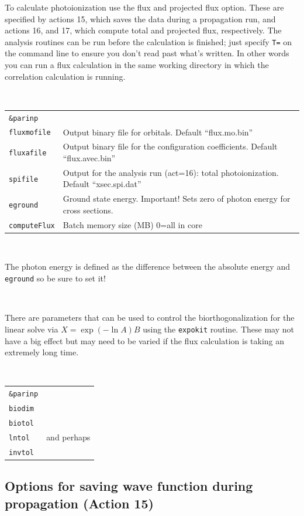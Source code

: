 \documentclass[10pt,leqno, oneside]{book}
\begin{document}
To calculate photoionization use the flux and projected flux option.  These are specified by actions 15, which saves the data during a propagation run, and actions 16, and 17, which compute total and projected flux, respectively.  The analysis routines can be run before the calculation is finished; just specify \verb#T=# on the command line to ensure you don't read past what's written.  In other words you can run a flux calculation in the same working directory in which the correlation 
calculation is running.

\

{\footnotesize
\begin{tabular}{ll}
\verb#&parinp# \\
\verb#fluxmofile#  &  Output binary file for orbitals.  Default ``flux.mo.bin'' \\
\verb#fluxafile#  &  Output binary file for the configuration coefficients.  Default ``flux.avec.bin'' \\
\verb#spifile#  &  Output for the analysis run (act=16): total photoionization.  Default ``xsec.spi.dat'' \\
\verb#eground# & Ground state energy.  Important!  Sets zero of photon energy for cross sections. \\
\verb#computeFlux#  & Batch memory size (MB)  0=all in core\\
\end{tabular}}

\

The photon energy is defined as the difference between the absolute energy and \verb#eground# so be sure to set it!

\

There are parameters that can be used to control the biorthogonalization for the linear solve via $X=\exp ( -\ln A )B$ using the \verb#expokit# routine.
These may not have a big effect but may need to be varied if the flux calculation is taking an extremely long time. 

\

{\footnotesize
\begin{tabular}{ll}
\verb#&parinp# & \\
\verb#biodim# & \\
\verb#biotol# & \\
\verb#lntol# & and perhaps \\
\verb#invtol#
\end{tabular}}

\subsection{Options for saving wave function during propagation (Action 15) \label{act15sect}}
\end{document}
